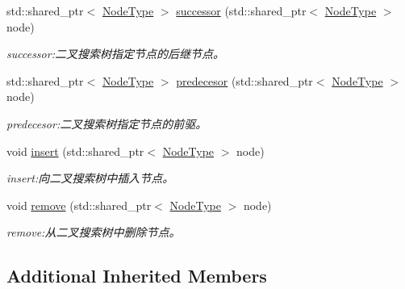 \begin{DoxyCompactItemize}
std\+::shared\+\_\+ptr$<$ \hyperlink{struct_introduction_to_algorithm_1_1_tree_algorithm_1_1_binary_tree_a9a441f3f41c5b69758204ba60fe02010}{Node\+Type} $>$ \hyperlink{class_introduction_to_algorithm_1_1_tree_algorithm_1_1_search_tree_a9d53e1f0b130263f2974dced515aa1f1}{successor} (std\+::shared\+\_\+ptr$<$ \hyperlink{struct_introduction_to_algorithm_1_1_tree_algorithm_1_1_binary_tree_a9a441f3f41c5b69758204ba60fe02010}{Node\+Type} $>$ node)
\begin{DoxyCompactList}\small\item\em successor\+:二叉搜索树指定节点的后继节点。 \end{DoxyCompactList}\item 
std\+::shared\+\_\+ptr$<$ \hyperlink{struct_introduction_to_algorithm_1_1_tree_algorithm_1_1_binary_tree_a9a441f3f41c5b69758204ba60fe02010}{Node\+Type} $>$ \hyperlink{class_introduction_to_algorithm_1_1_tree_algorithm_1_1_search_tree_a0e767d97590d19c97d595708d4419fe1}{predecesor} (std\+::shared\+\_\+ptr$<$ \hyperlink{struct_introduction_to_algorithm_1_1_tree_algorithm_1_1_binary_tree_a9a441f3f41c5b69758204ba60fe02010}{Node\+Type} $>$ node)
\begin{DoxyCompactList}\small\item\em predecesor\+:二叉搜索树指定节点的前驱。 \end{DoxyCompactList}\item 
void \hyperlink{class_introduction_to_algorithm_1_1_tree_algorithm_1_1_search_tree_a83724f0079d16419d4cceba74602cee1}{insert} (std\+::shared\+\_\+ptr$<$ \hyperlink{struct_introduction_to_algorithm_1_1_tree_algorithm_1_1_binary_tree_a9a441f3f41c5b69758204ba60fe02010}{Node\+Type} $>$ node)
\begin{DoxyCompactList}\small\item\em insert\+:向二叉搜索树中插入节点。 \end{DoxyCompactList}\item 
void \hyperlink{class_introduction_to_algorithm_1_1_tree_algorithm_1_1_search_tree_a3b59a0c117766590f7f01027ad0fbfff}{remove} (std\+::shared\+\_\+ptr$<$ \hyperlink{struct_introduction_to_algorithm_1_1_tree_algorithm_1_1_binary_tree_a9a441f3f41c5b69758204ba60fe02010}{Node\+Type} $>$ node)
\begin{DoxyCompactList}\small\item\em remove\+:从二叉搜索树中删除节点。 \end{DoxyCompactList}\end{DoxyCompactItemize}
\subsection*{Additional Inherited Members}


